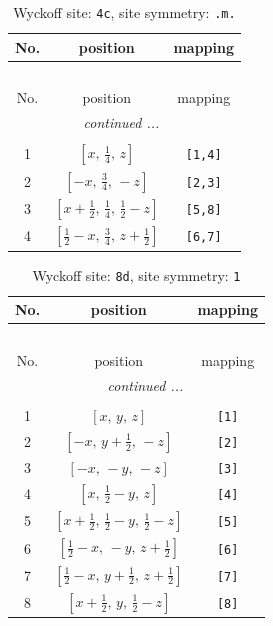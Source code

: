 \documentclass[fleqn,8pt]{jsarticle}
\begin{document}
\renewcommand{\arraystretch}{1.2}
\begin{longtable}{ccc}
\caption{Wyckoff site: {\tt 4c}, site symmetry: {\tt .m.}}
 \\
 \hline \hline
No. & position & mapping \\ \hline \endfirsthead

\multicolumn{2}{l}{\tablename\ \thetable{}} \\
 \hline \hline
No. & position & mapping \\ \hline \endhead

 \hline \hline
\multicolumn{2}{r}{\footnotesize\it continued ...} \\ \endfoot

 \hline \hline
\multicolumn{2}{r}{} \\ \endlastfoot

1 & $\left[ x,\, \frac{1}{4},\, z \right]$ & {\tt [1,4]} \\ \hline
2 & $\left[ - x,\, \frac{3}{4},\, - z \right]$ & {\tt [2,3]} \\ \hline
3 & $\left[ x + \frac{1}{2},\, \frac{1}{4},\, \frac{1}{2} - z \right]$ & {\tt [5,8]} \\ \hline
4 & $\left[ \frac{1}{2} - x,\, \frac{3}{4},\, z + \frac{1}{2} \right]$ & {\tt [6,7]} \\
\end{longtable}
\renewcommand{\arraystretch}{1.2}
\begin{longtable}{ccc}
\caption{Wyckoff site: {\tt 8d}, site symmetry: {\tt 1}}
 \\
 \hline \hline
No. & position & mapping \\ \hline \endfirsthead

\multicolumn{2}{l}{\tablename\ \thetable{}} \\
 \hline \hline
No. & position & mapping \\ \hline \endhead

 \hline \hline
\multicolumn{2}{r}{\footnotesize\it continued ...} \\ \endfoot

 \hline \hline
\multicolumn{2}{r}{} \\ \endlastfoot

1 & $\left[ x,\, y,\, z \right]$ & {\tt [1]} \\ \hline
2 & $\left[ - x,\, y + \frac{1}{2},\, - z \right]$ & {\tt [2]} \\ \hline
3 & $\left[ - x,\, - y,\, - z \right]$ & {\tt [3]} \\ \hline
4 & $\left[ x,\, \frac{1}{2} - y,\, z \right]$ & {\tt [4]} \\ \hline
5 & $\left[ x + \frac{1}{2},\, \frac{1}{2} - y,\, \frac{1}{2} - z \right]$ & {\tt [5]} \\ \hline
6 & $\left[ \frac{1}{2} - x,\, - y,\, z + \frac{1}{2} \right]$ & {\tt [6]} \\ \hline
7 & $\left[ \frac{1}{2} - x,\, y + \frac{1}{2},\, z + \frac{1}{2} \right]$ & {\tt [7]} \\ \hline
8 & $\left[ x + \frac{1}{2},\, y,\, \frac{1}{2} - z \right]$ & {\tt [8]} \\
\end{longtable}
\end{document}
